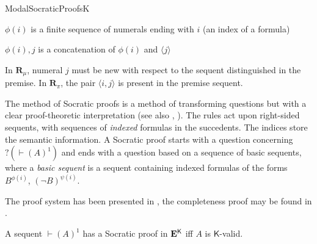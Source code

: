\begin{entry}{ModalSocraticProofsK}
\begin{calculus}
\begin{center}
\bigskip

$\phi(i)$ is a finite sequence of numerals ending with $i$ (an index of a formula)

$\phi(i), j$ is a concatenation of $\phi(i)$ and $\langle j \rangle$
\end{center}

\bigskip

In $\mathbf{R}_\mu$, numeral $j$ must be new with respect to the sequent distinguished in the premise. In $\mathbf{R}_\pi$, the pair $\langle i, j \rangle$ is present in the premise sequent.

\end{calculus}

\begin{clarifications}
The method of Socratic proofs is a method of transforming questions but with a clear proof-theoretic interpretation (see also , ). The rules act upon right-sided sequents, with sequences of \textit{indexed} formulas in the succedents. The indices store the semantic information. A Socratic proof starts with a question concerning $?(\vdash (A)^1)$ and ends with a question based on a sequence of basic sequents, where a \textit{basic sequent} is a sequent containing indexed formulas of the forms $B^{\phi(i)}$, $(\lnot B)^{\psi(i)}$.
\end{clarifications}

\begin{history}
The proof system has been presented in \cite{DLJ:2004}, the completeness proof may be found in \cite{DLJ:2007}.
\end{history}

\begin{technicalities}
A sequent $\vdash (A)^1$ has a Socratic proof in $\mathbf{E}^\mathsf{K}$ iff $A$ is $\mathsf{K}$-valid.
\end{technicalities}



%
%
%
%
%
%
% 
%




\end{entry}
